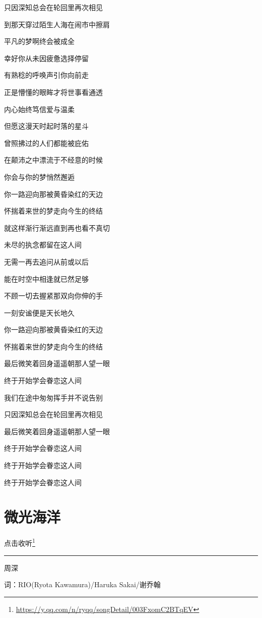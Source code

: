 \documentclass[]{ctexbook}
\renewcommand{\href}[2]{#2\footnote{\url{#1}}}
\begin{document}
只因深知总会在轮回里再次相见

到那天穿过陌生人海在闹市中擦肩

平凡的梦啊终会被成全

幸好你从未因疲惫选择停留

有熟稔的呼唤声引你向前走

正是懵懂的眼眸才将世事看通透

内心始终笃信爱与温柔

但愿这漫天时起时落的星斗

曾照拂过的人们都能被庇佑

在颠沛之中漂流于不经意的时候

你会与你的梦悄然邂逅

你一路迎向那被黄昏染红的天边

怀揣着来世的梦走向今生的终结

就这样渐行渐远直到再也看不真切

未尽的执念都留在这人间

无需一再去追问从前或以后

能在时空中相逢就已然足够

不顾一切去握紧那双向你伸的手

一刻安谧便是天长地久

你一路迎向那被黄昏染红的天边

怀揣着来世的梦走向今生的终结

最后微笑着回身遥遥朝那人望一眼

终于开始学会眷恋这人间

我们在途中匆匆挥手并不说告别

只因深知总会在轮回里再次相见

最后微笑着回身遥遥朝那人望一眼

终于开始学会眷恋这人间

终于开始学会眷恋这人间

终于开始学会眷恋这人间

\section*{微光海洋}\label{sea-of-shimmer}


\href{https://y.qq.com/n/ryqq/songDetail/003FxomC2BTqEV}{点击收听}

\begin{center}\rule{0.5\linewidth}{0.5pt}\end{center}

周深

词：RIO(Ryota Kawamura)/Haruka Sakai/谢乔翰
\end{document}
